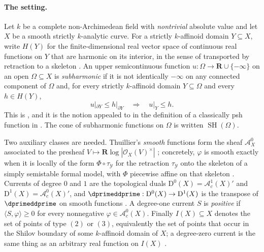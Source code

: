 \paragraph{The setting.}
Let $k$ be a complete non-Archimedean field with \emph{nontrivial} absolute
value and let $X$ be a smooth strictly $k$-analytic curve.  For a strictly
$k$-affinoid domain $Y\subseteq X$, write $H(Y)$ for the finite-dimensional
real vector space of continuous real functions on $Y$ that are harmonic on
its interior, in the sense of  transported by
retraction to a skeleton \cite[\S2.3]{Thu05}.  An upper semicontinuous
function $u:\Omega\to\mathbf R\cup\{-\infty\}$ on an open
$\Omega\subseteq X$ is \emph{subharmonic} if it is not identically $-\infty$
on any connected component of $\Omega$ and, for every strictly $k$-affinoid
domain $Y\subseteq\Omega$ and every $h\in H(Y)$,
\begin{equation}
\label{eq:ch15-thuillier-sh}
 u|_{\partial Y}\le h|_{\partial Y}
 \quad\Longrightarrow\quad
 u|_Y\le h .
\end{equation}
This is \cite[D\'efinition~3.1.5]{Thu05}, and it is the notion appealed to in
the definition of a classically psh function in
.  The cone of subharmonic functions on $\Omega$ is
written $\operatorname{SH}(\Omega)$.

Two auxiliary classes are needed.  Thuillier's \emph{smooth} functions form
the sheaf $\mathcal A^0_X$ associated to the presheaf
$V\mapsto\mathbf R\log|\mathcal O_X(V)^\times|$
\cite[Proposition~3.2.5]{Thu05}; concretely, $\varphi$ is smooth exactly when
it is locally of the form $\Phi\circ\tau_{\mathcal Y}$ for the retraction
$\tau_{\mathcal Y}$ onto the skeleton of a simply semistable formal model,
with $\Phi$ piecewise affine on that skeleton
\cite[Proposition~3.2.4]{Thu05}.  Currents of degree $0$ and $1$ are the
topological duals $\mathrm D^0(X)=\mathcal A^1_c(X)'$ and
$\mathrm D^1(X)=\mathcal A^0_c(X)'$, and $\dprimeddprime:\mathrm D^0(X)\to\mathrm
D^1(X)$ is the transpose of $\dprimeddprime$ on smooth functions
\cite[D\'efinition~3.3.1 and Proposition~3.3.4]{Thu05}.  A degree-one current
$S$ is \emph{positive} if $\langle S,\varphi\rangle\ge0$ for every
nonnegative $\varphi\in\mathcal A^0_c(X)$.  Finally $I(X)\subseteq X$ denotes
the set of points of type $(2)$ or $(3)$, equivalently the set of points that
occur in the Shilov boundary of some $k$-affinoid domain of $X$; a
degree-zero current is the same thing as an arbitrary real function on
$I(X)$ \cite[Proposition~3.3.3]{Thu05}.

